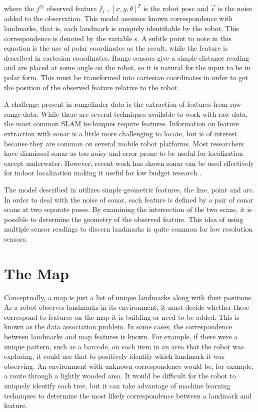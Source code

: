 where the $j^{th}$ observed feature $f_j$ , $[x,y,\theta ]^T$ is the robot pose and $\vec{\epsilon}$ is the noise added to the observation.  This model assumes known correspondence with landmarks, that is, each landmark is uniquely identifiable by the robot.  This correspondence is denoted by the variable s.  A subtle point to note in this equation is the use of polar coordinates as the result, while the feature is described in cartesian coordinates.  Range sensors give a simple distance reading and are placed at some angle on the robot, so it is natural for the input to be in polar form.  This must be transformed into cartesian coordinates in order to get the position of the observed feature relative to the robot.  

A challenge present in rangefinder data is the extraction of features from raw range data. While there are several techniques available to work with raw data, the most common SLAM techniques require features.  Information on feature extraction with sonar is a little more challenging to locate, but is of interest because they are common on several mobile robot platforms.  Most researchers have dismissed sonar as too noisy and error prone to be useful for localization except underwater.  However, recent work has shown sonar can be used effectively for indoor localization making it useful for low budget research \cite{lee2007feature}.  

The model described in \cite{lee2007feature} utilizes simple geometric features, the line, point and arc.  In order to deal with the noise of sonar, each feature is defined by a pair of sonar scans at two separate poses.  By examining the intersection of the two scans, it is possible to determine the geometry of the observed feature.  This idea of using multiple sensor readings to discern landmarks is quite common for low resolution sensors.

\section{The Map}

Conceptually, a map is just a list of unique landmarks along with their positions.  As a robot observes landmarks in its environment, it must decide whether these correspond to features on the map it is building or need to be added.  This is known as the data association problem.  In some cases, the correspondence between landmarks and map features is known.  For example, if there were a unique pattern, such as a barcode, on each item in an area that the robot was exploring, it could use that to positively identify which landmark it was observing.  An environment with unknown correspondence would be, for example, a route through a lightly wooded area.  It would be difficult for the robot to uniquely identify each tree, but it can take advantage of machine learning techniques to determine the most likely correspondence between a landmark and feature.

